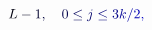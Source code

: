 \documentclass[12pt]{article}
\begin{document}
\makeatletter
\renewcommand*{\@textcolor}[3]{%
  \protect\leavevmode
  \begingroup
    \color#1{#2}#3%
  \endgroup
}
\makeatother
\begin{displaymath}
\mathcolor[RGB]{0,0,15}{L} \mathcolor[RGB]{0,0,30}{-} \mathcolor[RGB]{0,0,45}{1} \mathcolor[RGB]{0,0,60}{,} \quad \mathcolor[RGB]{0,0,75}{0} \mathcolor[RGB]{0,0,90}{\le} \mathcolor[RGB]{0,0,105}{j} \mathcolor[RGB]{0,0,120}{\le} \mathcolor[RGB]{0,0,135}{3} \mathcolor[RGB]{0,0,150}{k} \mathcolor[RGB]{0,0,165}{/} \mathcolor[RGB]{0,0,180}{2} \mathcolor[RGB]{0,0,195}{,}
\end{displaymath}
\end{document}

